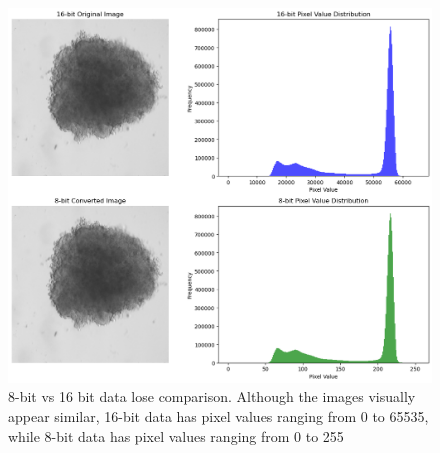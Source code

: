 \begin{figure}[H]
  \centering
  \includegraphics[scale=0.4]{figures/8bitvs16bit.png} 
  \caption{8-bit vs 16 bit data lose comparison. Although the images visually appear similar, 16-bit data has pixel values ranging from 0 to 65535, while 8-bit data has pixel values ranging from 0 to 255}
  \label{fig:8bitvs16bit}
\end{figure}

